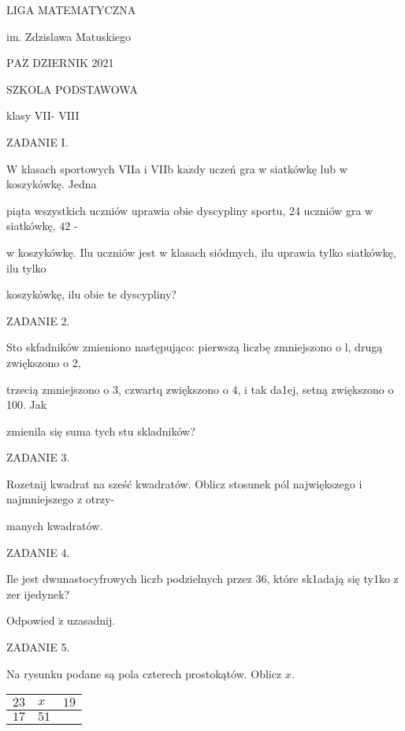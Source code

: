 \documentclass[a4paper,12pt]{article}
\begin{document}
LIGA MATEMATYCZNA

im. Zdzislawa Matuskiego

$\mathrm{P}\mathrm{A}\dot{\mathrm{Z}}$ DZIERNIK 2021

SZKOLA PODSTAWOWA

klasy VII- VIII

ZADANIE I.

$\mathrm{W}$ klasach sportowych VIIa i VIIb $\mathrm{k}\mathrm{a}\dot{\mathrm{z}}\mathrm{d}\mathrm{y}$ uczeń gra w siatkówkę lub w koszykówkę. Jedna

piąta wszystkich uczniów uprawia obie dyscypliny sportu, 24 uczniów gra w siatkówkę, $42$ -

w koszykówkę. Ilu uczniów jest w klasach siódmych, ilu uprawia tylko siatkówkę, ilu tylko

koszykówkę, ilu obie te dyscypliny?

ZADANIE 2.

Sto skfadników zmieniono następująco: pierwszą liczbę zmniejszono o l, drugą zwiększono o 2,

trzecią zmniejszono o 3, czwartq zwiększono o 4, i tak da1ej, setną zwiększono o 100. Jak

zmienila się suma tych stu skladników?

ZADANIE 3.

Rozetnij kwadrat na sześć kwadratów. Oblicz stosunek pól największego i najmniejszego z otrzy-

manych kwadratów.

ZADANIE 4.

Ile jest dwunastocyfrowych liczb podzielnych przez 36, które sk1adają się ty1ko z zer ijedynek?

Odpowied $\acute{\mathrm{z}}$ uzasadnij.

ZADANIE 5.

Na rysunku podane są pola czterech prostokątów. Oblicz $x.$
\begin{center}
\begin{tabular}{|l|ll|}
\hline
\multicolumn{1}{|l|}{$23$}&	\multicolumn{1}{|l|}{ $x$}&	\multicolumn{1}{|l|}{ $19$}	\\
\hline
\multicolumn{1}{|l|}{ $17$}&	\multicolumn{1}{|l}{ $51$}&	\multicolumn{1}{l|}{}	\\
\hline
\end{tabular}

\end{center}
\end{document}
